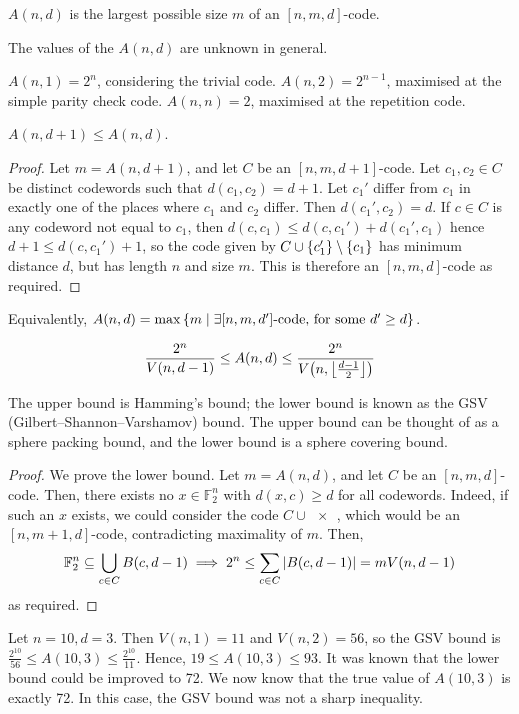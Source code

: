 \begin{definition}
    \( A(n,d) \) is the largest possible size \( m \) of an \( [n,m,d] \)-code.
\end{definition}
The values of the \( A(n,d) \) are unknown in general.
\begin{example}
    \( A(n,1) = 2^n \), considering the trivial code.
    \( A(n,2) = 2^{n-1} \), maximised at the simple parity check code.
    \( A(n,n) = 2 \), maximised at the repetition code.
\end{example}
\begin{lemma}
    \( A(n,d+1) \leq A(n,d) \).
\end{lemma}
\begin{proof}
    Let \( m = A(n,d+1) \), and let \( C \) be an \( [n,m,d+1] \)-code.
    Let \( c_1, c_2 \in C \) be distinct codewords such that \( d(c_1,c_2) = d+1 \).
    Let \( c_1' \) differ from \( c_1 \) in exactly one of the places where \( c_1 \) and \( c_2 \) differ.
    Then \( d(c_1', c_2) = d \).
    If \( c \in C \) is any codeword not equal to \( c_1 \), then \( d(c,c_1) \leq d(c,c_1') + d(c_1',c_1) \) hence \( d + 1 \leq d(c,c_1') + 1 \), so the code given by \( C \cup \qty{c_1'} \setminus \qty{c_1} \) has minimum distance \( d \), but has length \( n \) and size \( m \).
    This is therefore an \( [n,m,d] \)-code as required.
\end{proof}
\begin{corollary}
    Equivalently, \( A(n,d) = \max \qty{m \mid \exists [n,m,d'] \text{-code, for some } d' \geq d} \).
\end{corollary}
\begin{theorem}
    \[ \frac{2^n}{V(n,d-1)} \leq A(n,d) \leq \frac{2^n}{V\qty(n,\floor*{\frac{d-1}{2}})} \]
\end{theorem}
The upper bound is Hamming's bound; the lower bound is known as the GSV (Gilbert--Shannon--Varshamov) bound.
The upper bound can be thought of as a sphere packing bound, and the lower bound is a sphere covering bound.
\begin{proof}
    We prove the lower bound.
    Let \( m = A(n,d) \), and let \( C \) be an \( [n,m,d] \)-code.
    Then, there exists no \( x \in \mathbb F_2^n \) with \( d(x,c) \geq d \) for all codewords.
    Indeed, if such an \( x \) exists, we could consider the code \( C \cup \qty{x} \), which would be an \( [n,m+1,d] \)-code, contradicting maximality of \( m \).
    Then,
    \[ \mathbb F_2^n \subseteq \bigcup_{c \in C} B(c,d-1) \implies 2^n \leq \sum_{c \in C} \abs{B(c,d-1)} = mV(n,d-1) \]
    as required.
\end{proof}
\begin{example}
    Let \( n = 10, d = 3 \).
    Then \( V(n,1) = 11 \) and \( V(n,2) = 56 \), so the GSV bound is \( \frac{2^{10}}{56} \leq A(10,3) \leq \frac{2^{10}}{11} \).
    Hence, \( 19 \leq A(10,3) \leq 93 \).
    It was known that the lower bound could be improved to 72.
    We now know that the true value of \( A(10,3) \) is exactly 72.
    In this case, the GSV bound was not a sharp inequality.
\end{example}

